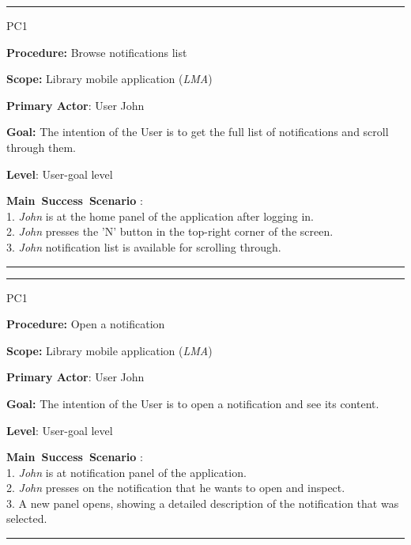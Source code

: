 
\vspace{0.5cm}
\hrule
\begin{lyxlist}{PC1}
\small{
\item [\textbf{Procedure:}] Browse notifications list
\item [\textbf{Scope:}] Library mobile application (\emph{LMA})
\item [\textbf{Primary Actor}:] User John
\item [\textbf{Goal:}] The intention of the User is to get the full list of
notifications and scroll through them.
\item [\textbf{Level}:] User-goal level
\item [\textbf{Main~Success~Scenario}]:\\
1. \emph{John} is at the home panel of the application after logging in.\\
2. \emph{John} presses the 'N' button in the top-right corner of the screen.\\
3. \emph{John} notification list is available for scrolling through.\\

}

\end{lyxlist}
\hrule

\vspace{0.5cm}
\hrule
\begin{lyxlist}{PC1}
\small{
\item [\textbf{Procedure:}] Open a notification
\item [\textbf{Scope:}] Library mobile application (\emph{LMA})
\item [\textbf{Primary Actor}:] User John
\item [\textbf{Goal:}] The intention of the User is to open a notification and
see its content.
\item [\textbf{Level}:] User-goal level
\item [\textbf{Main~Success~Scenario}]:\\
1. \emph{John} is at notification panel of the application.\\
2. \emph{John} presses on the notification that he wants to open and inspect.\\
3. A new panel opens, showing a detailed description of the notification that
was selected.\\

}

\end{lyxlist}
\hrule






